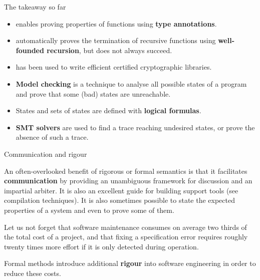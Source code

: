 \documentclass[compress,dvips,xcolor={dvipsnames},t]{beamer}
\begin{document}
%
\begin{frame}{The takeaway so far}

  \begin{itemize}

    \item \Fstar enables proving properties of functions using
      \textbf{type annotations}.

    \item \Fstar automatically proves the termination of recursive
      functions using \textbf{well-founded recursion}, but does not
      always succeed.

    \item \Fstar has been used to write efficient certified
      cryptographic libraries.

    \item \textbf{Model checking} is a technique to analyse all
      possible states of a program and prove that some (bad) states
      are unreachable.

    \item States and sets of states are defined with \textbf{logical
      formulas}.

    \item \textbf{SMT solvers} are used to find a trace reaching
      undesired states, or prove the absence of such a trace.


  \end{itemize}

\end{frame}

%
\begin{frame}{Communication and rigour}

  An often-overlooked benefit of rigorous or formal semantics is that
  it facilitates \textbf{communication} by providing an unambiguous
  framework for discussion and an impartial arbiter. It is also an
  excellent guide for building support tools (see compilation
  techniques). It is also sometimes possible to state the expected
  properties of a system and even to prove some of them.

  \bigskip

  Let us not forget that software maintenance consumes on average two
  thirds of the total cost of a project, and that fixing a
  specification error requires roughly twenty times more effort if it
  is only detected during operation.

  \bigskip

  Formal methods introduce additional \textbf{rigour} into software
  engineering in order to reduce these costs.

\end{frame}
\end{document}
